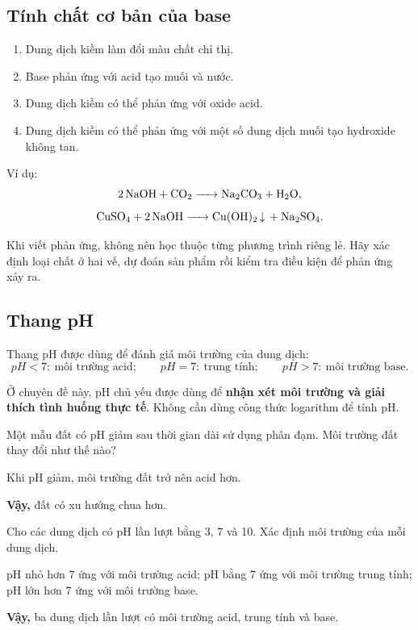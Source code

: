 \subsection{Tính chất cơ bản của base}

\begin{enumerate}
\item Dung dịch kiềm làm đổi màu chất chỉ thị.
\item Base phản ứng với acid tạo muối và nước.
\item Dung dịch kiềm có thể phản ứng với oxide acid.
\item Dung dịch kiềm có thể phản ứng với một số dung dịch muối tạo hydroxide không tan.
\end{enumerate}

Ví dụ:
\[
\ce{2NaOH + CO2 -> Na2CO3 + H2O},
\]
\[
\ce{CuSO4 + 2NaOH -> Cu(OH)2 v + Na2SO4}.
\]

\begin{notechem}
Khi viết phản ứng, không nên học thuộc từng phương trình riêng lẻ. Hãy xác định loại chất ở hai vế, dự đoán sản phẩm rồi kiểm tra điều kiện để phản ứng xảy ra.
\end{notechem}

\subsection{Thang pH}

Thang pH được dùng để đánh giá môi trường của dung dịch:
\[
pH<7:\ \text{môi trường acid};\qquad
pH=7:\ \text{trung tính};\qquad
pH>7:\ \text{môi trường base}.
\]

Ở chuyên đề này, pH chủ yếu được dùng để \textbf{nhận xét môi trường và giải thích tình huống thực tế}. Không cần dùng công thức logarithm để tính pH.

\begin{vidu}
Một mẫu đất có pH giảm sau thời gian dài sử dụng phân đạm. Môi trường đất thay đổi như thế nào?
\end{vidu}
\begin{loigiai}
Khi pH giảm, môi trường đất trở nên acid hơn.

\textbf{Vậy,} đất có xu hướng chua hơn.
\end{loigiai}

\begin{tuluyen}
Cho các dung dịch có pH lần lượt bằng 3, 7 và 10. Xác định môi trường của mỗi dung dịch.
\begin{loigiaiBT}
pH nhỏ hơn 7 ứng với môi trường acid; pH bằng 7 ứng với môi trường trung tính; pH lớn hơn 7 ứng với môi trường base.

\textbf{Vậy,} ba dung dịch lần lượt có môi trường acid, trung tính và base.
\end{loigiaiBT}
\end{tuluyen}

